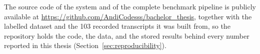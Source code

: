 The source code of the system and of the complete benchmark pipeline is publicly available at \url{https://github.com/AndiCodesss/bachelor_thesis}, together with the labelled dataset and the 103 recorded transcripts it was built from, so the repository holds the code, the data, and the stored results behind every number reported in this thesis (Section~\ref{sec:reproducibility}).


\newpage
